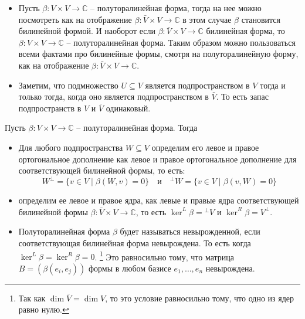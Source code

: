 \begin{itemize}
\item Пусть $\beta\colon V\times V\to \mathbb C$ -- полуторалинейная форма, тогда на нее можно посмотреть как на отображение $\beta\colon \bar V\times V\to \mathbb C$ в этом случае $\beta$ становится билинейной формой.
И наоборот если $\beta\colon \bar V\times V\to \mathbb C$ билинейная форма, то $\beta\colon V\times V\to \mathbb C$ -- полуторалинейная форма.
Таким образом можно пользоваться всеми фактами про билинейные формы, смотря на полуторалинейную форму, как на отображение $\beta\colon \bar V\times V\to \mathbb C$.

\item Заметим, что подмножество $U\subseteq V$ является подпространством в $V$ тогда и только тогда, когда оно является подпространством в $\bar V$.
То есть запас подпространств в $V$ и $\bar V$ одинаковый.
\end{itemize}

\begin{definition}
Пусть $\beta\colon V\times V\to \mathbb C$ -- полуторалинейная форма.
Тогда
\begin{itemize}
\item Для любого подпространства $W\subseteq V$ определим его левое и правое ортогональное дополнение как левое и правое ортогональное дополнение для соответствующей билинейной формы, то есть:
\[
W^\bot = \{v\in V\mid \beta(W,v) = 0\}\quad \text{и} \quad {}^\bot W = \{v\in V\mid \beta(v, W) = 0\}
\]

\item  определим ее левое и правое ядра, как левые и правые ядра соответствующей билинейной формы $\beta\colon \bar V\times V\to \mathbb C$, то есть $\ker^L \beta= {}^\bot V$ и $\ker^R \beta = V^\bot$.

\item Полуторалинейная форма $\beta$ будет называться невырожденной, если соответствующая билинейная форма невырождена.
То есть когда $\ker^L\beta = \ker ^R\beta = 0$.%
\footnote{Так как $\dim \bar V = \dim V$, то это условие равносильно тому, что одно из ядер равно нулю.}
Это равносильно тому, что матрица $B = (\beta(e_i, e_j))$ формы в любом базисе $e_1,\ldots,e_n$ невырождена.
\end{itemize}
 
\end{definition}

